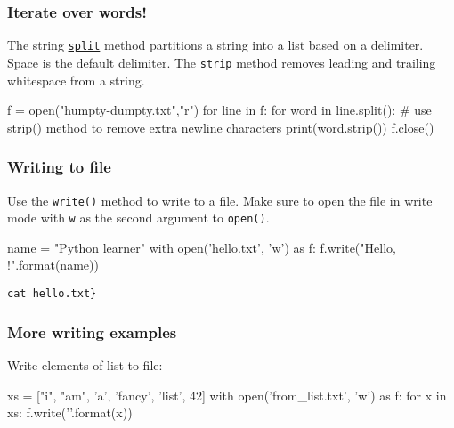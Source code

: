 \documentclass[12pt]{article} \newif\ifsolution\solutiontrue %
\begin{document}
\subsubsection{Iterate over words!}\label{iterate-over-words}

The string
\href{https://docs.python.org/3/library/stdtypes.html\#str.split}{\texttt{split}}
method partitions a string into a list based on a delimiter. Space is
the default delimiter. The
\href{https://docs.python.org/3/library/stdtypes.html\#str.strip}{\texttt{strip}}
method removes leading and trailing whitespace from a string.

\begin{python}
f = open("humpty-dumpty.txt","r") for line in f:     for word in line.split():         # use strip() method to remove extra newline characters         print(word.strip()) f.close()
\end{python}

\subsubsection{Writing to file}\label{writing-to-file}

Use the \texttt{write()} method to write to a file. Make sure to open
the file in write mode with
\texttt{\textquotesingle{}w\textquotesingle{}} as the second argument to
\texttt{open()}.

\begin{python}
name = "Python learner" with open('hello.txt', 'w') as f:     f.write("Hello, {}!\n".format(name))
\end{python}

\begin{verbatim}
cat hello.txt}
\end{verbatim}

\subsubsection{More writing examples}\label{more-writing-examples}

Write elements of list to file:

\begin{python}
xs = ["i", "am", 'a', 'fancy', 'list', 42] with open('from_list.txt', 'w') as f:     for x in xs:         f.write('{}\n'.format(x))
\end{python}

\begin{python}
\OperatorTok{%
\end{python}
\end{document}
